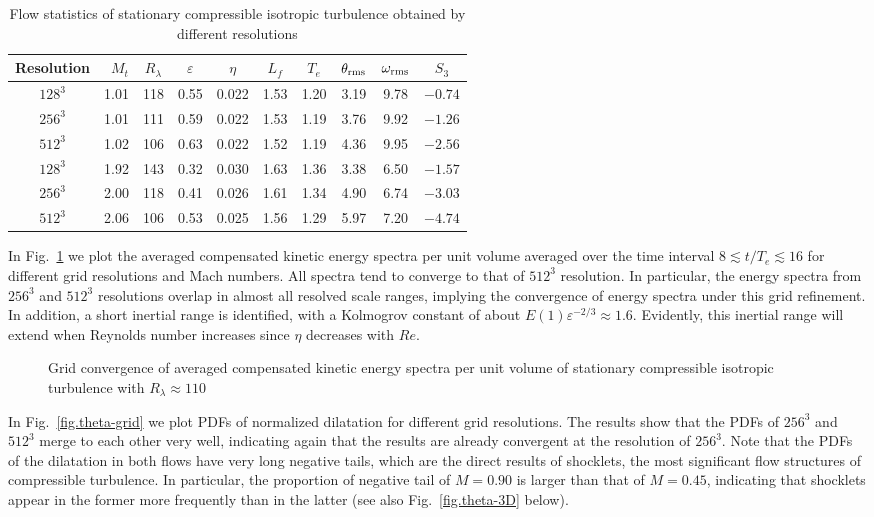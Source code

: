 \documentclass[review]{elsarticle}
\begin{document}
\begin{table}
  \centering
  \caption{Flow statistics of stationary compressible isotropic turbulence obtained by different resolutions}
  \begin{tabular}{|crcccccccc|} \hline
  Resolution & $M_t$ & $R_\lambda$& $\varepsilon$ & $\eta$ & $L_f$ & $T_e$ & $\theta_{\rm rms}$ & $\omega_{\rm rms}$ & $S_3$ \\ \hline
  $128^3$ & 1.01 & 118 & 0.55 & 0.022 & 1.53 & 1.20 & 3.19 & 9.78 & $-0.74$ \\
  $256^3$ & 1.01 & 111 & 0.59 & 0.022 & 1.53 & 1.19 & 3.76 & 9.92 & $-1.26$ \\
  $512^3$ & 1.02 & 106 & 0.63 & 0.022 & 1.52 & 1.19 & 4.36 & 9.95 & $-2.56$ \\ \hline
  $128^3$ & 1.92 & 143 & 0.32 & 0.030 & 1.63 & 1.36 & 3.38 & 6.50 & $-1.57$ \\
  $256^3$ & 2.00 & 118 & 0.41 & 0.026 & 1.61 & 1.34 & 4.90 & 6.74 & $-3.03$ \\
  $512^3$ & 2.06 & 106 & 0.53 & 0.025 & 1.56 & 1.29 & 5.97 & 7.20 & $-4.74$ \\ \hline
  \end{tabular}
  \label{tab2}
\end{table}

In Fig.~\ref{fig.M090R200} we plot the averaged compensated kinetic energy spectra per unit volume averaged over the time interval $8 \lesssim t/T_e \lesssim 16$ for different grid resolutions and Mach numbers. All spectra tend to converge to that of $512^3$ resolution. In particular, the energy spectra from $256^3$ and $512^3$ resolutions overlap in almost all resolved scale ranges, implying the convergence of energy spectra under this grid refinement. In addition, a short inertial range is identified, with a Kolmogrov constant of about $E(1) \varepsilon^{-2/3} \approx 1.6$. Evidently, this inertial range will extend when Reynolds number increases since $\eta$ decreases with $Re$.

\begin{figure}
  \centering
  \subfigure[$M_t \approx 1.0$]{\texttt{[image: M045R200]}}
  \subfigure[$M_t \approx 2.0$]{\texttt{[image: M090R200]}}
  \caption{Grid convergence of averaged compensated kinetic energy spectra per unit volume of stationary compressible isotropic turbulence with $R_\lambda \approx 110$}
  \label{fig.M090R200}
\end{figure}

In Fig.~\ref{fig.theta-grid} we plot PDFs of normalized dilatation for different grid resolutions. The results show that the PDFs of $256^3$ and $512^3$ merge to each other very well, indicating again that the results are already convergent at the resolution of $256^3$. Note that the PDFs of the dilatation in both flows have very long negative tails, which are the direct results of shocklets, the most significant flow structures of compressible turbulence. In particular, the proportion of negative tail of $M=0.90$ is larger than that of $M=0.45$, indicating that shocklets appear in the former more frequently than in the latter (see also Fig.~\ref{fig.theta-3D} below).
\end{document}
